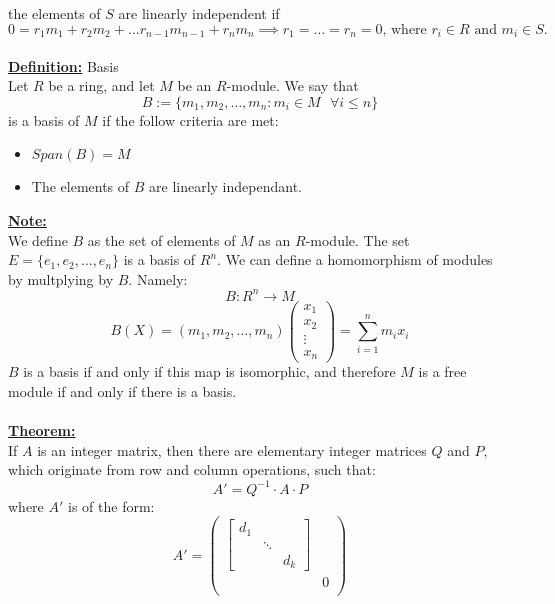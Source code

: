 \documentclass[11pt]{article}
\theoremstyle{plain}
\theoremstyle{definition}
\begin{document}
the elements of $S$ are linearly independent if 
\begin{equation*}
0=r_1 m_1 + r_2 m_2 + \ldots r_{n-1} m_{n-1} + r_n m_n \implies r_1 = \ldots = r_n = 0 \text{, where } r_i \in R \text{ and } m_i \in S.
\end{equation*}
\\
\textbf{\underline{Definition:}} Basis \\
Let $R$ be a ring, and let $M$ be an $R$-module. We say that 
\begin{equation*}
B:=\{m_1, m_2, \ldots, m_n : m_i \in M\text{ } \forall i \leq n\}
\end{equation*}
is a basis of $M$ if the follow criteria are met:
\begin{itemize}
	\item $Span(B)= M$
	\item The elements of $B$ are linearly independant.
\end{itemize}
\textbf{\underline{Note:}}\\
We define $B$ as the set of elements of $M$ as an $R$-module. The set $E=\{e_1,e_2,\ldots,e_n\}$ is a basis of $R^n$. We can define a homomorphism of modules by multplying by $B$. Namely: 
\begin{equation*}
B: R^n \rightarrow M
\end{equation*}
\begin{equation*}
B(X) = (m_1, m_2, \ldots, m_n)  
\begin{pmatrix}
x_1\\
x_2\\
\vdots\\
x_n
\end{pmatrix}
= \sum_{i=1}^{n} m_i x_i
\end{equation*}
$B$ is a basis if and only if this map is isomorphic, and therefore $M$ is a free module if and only if there is a basis.\\
\\
\textbf{\underline{Theorem:}}\\
If $A$ is an integer matrix, then there are elementary integer matrices  $Q$ and $P$, which originate from row and column operations, such that:
\begin{equation*}
A'=Q^{-1} \cdot A \cdot P
\end{equation*}
where $A'$ is of the form:
\[ A'= \left( \begin{array}{cc}
\left[\begin{array}{ccc}
    d_{1} &  & \\
     &\ddots & \\
      & & d_k
    \end{array}\right] & \\
     & 0\\   \end{array}\right) \]
\end{document}
